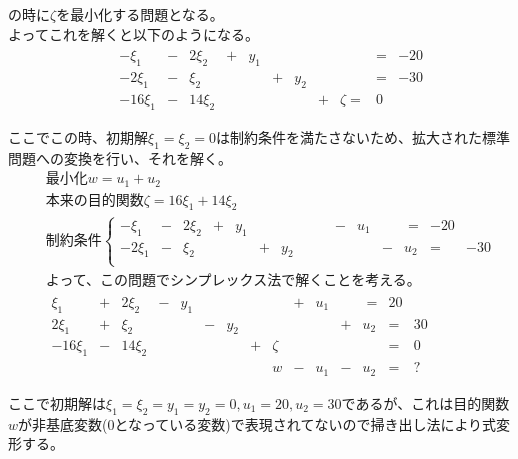 \documentclass[dvipdfmx,titlepage, a4paper]{jsarticle}%
\begin{document}
の時に$\zeta$を最小化する問題となる。\\
よってこれを解くと以下のようになる。
\begin{eqnarray*}
	&&\begin{array}{cccccccccccc}
		-\xi_{1} & - & 2\xi_{2} & + & y_{1} & \; & \; & \; & \; & = & -20\\
		-2\xi_{1} & - & \xi_{2} & \; & \; & + & y_{2} & \; & \; & = & -30\\
		-16\xi_{1} & - & 14\xi_{2} & \; & \; & \; & \; & + & \zeta = & 0\\
	\end{array}\\
\end{eqnarray*}
ここでこの時、初期解$\xi_{1} = \xi_{2} = 0$は制約条件を満たさないため、拡大された標準問題への変換を行い、それを解く。\\
\begin{eqnarray*}
	&&\mbox{最小化}w = u_{1} + u_{2}\\
	&&\mbox{本来の目的関数}\zeta = 16\xi_{1} + 14\xi_{2}\\
	&&\mbox{制約条件}\left\{
		\begin{array}{cccccccccccccccc}
			-\xi_{1} & - & 2\xi_{2} & + & y_{1} & \; & \; & \; & \; & - & u_{1} & \; & \; = & -20\\
			-2\xi_{1} & - & \xi_{2} & \; & \; & + & y_{2} & \; & \; & \; & \; & - & u_{2} & = & -30\\
		\end{array}
		\right.\\
	&&\mbox{よって、この問題でシンプレックス法で解くことを考える。}\\
	&&\begin{array}{cccccccccccccccc}
			\xi_{1} & + & 2\xi_{2} & - & y_{1} & \; & \; & \; & \; & + & u_{1} & \; & \; = & 20\\
			2\xi_{1} & + & \xi_{2} & \; & \; & - & y_{2} & \; & \; & \; & \; & + & u_{2} & = & 30\\
			-16\xi_{1} & - & 14\xi_{2} & \; & \; & \; & \; & + & \zeta & \; & \; & \; & \; & = & 0\\
			\; & \; & \; & \; & \; & \; & \; & \; & w & - & u_{1} & - & u_{2} & = & ?\\
		\end{array}\\
\end{eqnarray*}
ここで初期解は$\xi_{1} = \xi_{2} = y_{1} = y_{2} = 0, u_{1} = 20, u_{2} = 30$であるが、これは目的関数$w$が非基底変数(0となっている変数)で表現されてないので掃き出し法により式変形する。
\end{document}
